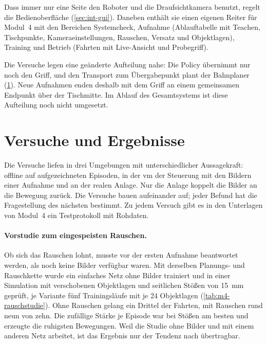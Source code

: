 Dass immer nur eine Seite den Roboter und die Draufsichtkamera benutzt, regelt die
Bedienoberfläche (\cref{sec:int-gui}). Daneben enthält sie einen eigenen Reiter für Modul~4 mit
den Bereichen Systemcheck, Aufnahme (Ablauftabelle mit Teachen, Tischpunkte,
Kameraeinstellungen, Rauschen, Versatz und Objektlagen), Training und Betrieb (Fahrten mit
Live-Ansicht und Probegriff).

Die Versuche legen eine geänderte Aufteilung nahe: Die Policy übernimmt nur noch den Griff, und
den Transport zum Übergabepunkt plant der Bahnplaner (\cref{sec:m4-ergebnisse}). Neue
Aufnahmen enden deshalb mit dem Griff an einem gemeinsamen Endpunkt über der Tischmitte. Im Ablauf
des Gesamtsystems ist diese Aufteilung noch nicht umgesetzt.

\section{Versuche und Ergebnisse}
\label{sec:m4-ergebnisse}

Die Versuche liefen in drei Umgebungen mit unterschiedlicher Aussagekraft: offline auf
aufgezeichneten Episoden, in der \ac{vm} der Steuerung mit den Bildern einer Aufnahme und an der
realen Anlage. Nur die Anlage koppelt die Bilder an die Bewegung zurück. Die Versuche bauen
aufeinander auf; jeder Befund hat die Fragestellung des nächsten bestimmt. Zu jedem Versuch gibt
es in den Unterlagen von Modul~4 ein Testprotokoll mit Rohdaten.

\paragraph{Vorstudie zum eingespeisten Rauschen.} Ob sich das Rauschen lohnt, musste vor der
ersten Aufnahme beantwortet werden, als noch keine Bilder verfügbar waren. Mit derselben Planungs-
und Rauschkette wurde ein einfaches Netz ohne Bilder trainiert und in einer Simulation mit
verschobenen Objektlagen und seitlichen Stößen von \SI{15}{\milli\metre} geprüft, je Variante fünf
Trainingsläufe mit je 24 Objektlagen (\cref{tab:m4-rauschstudie}). Ohne Rauschen gelang ein
Drittel der Fahrten, mit Rauschen rund neun von zehn. Die zufällige Stärke je Episode war bei
Stößen am besten und erzeugte die ruhigsten Bewegungen. Weil die Studie ohne Bilder und mit einem
anderen Netz arbeitet, ist das Ergebnis nur der Tendenz nach übertragbar.

